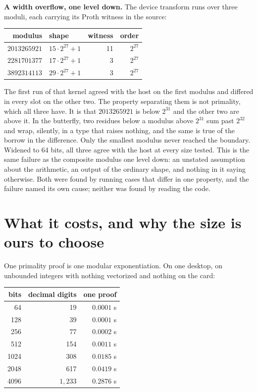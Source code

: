 \documentclass{article}
\begin{document}
\textbf{A width overflow, one level down.} The device transform runs over three moduli, each carrying its Proth witness in the source:

\begin{center}
\begin{tabular}{@{}rlrr@{}}
\toprule
modulus & shape & witness & order \\
\midrule
\(2013265921\) & \(15 \cdot 2^{27} + 1\) & 11 & \(2^{27}\) \\
\(2281701377\) & \(17 \cdot 2^{27} + 1\) & 3 & \(2^{27}\) \\
\(3892314113\) & \(29 \cdot 2^{27} + 1\) & 3 & \(2^{27}\) \\
\bottomrule
\end{tabular}
\end{center}

The first run of that kernel agreed with the host on the first modulus and differed in every slot on the other two. The property separating them is not primality, which all three have. It is that \(2013265921\) is below \(2^{31}\) and the other two are above it. In the butterfly, two residues below a modulus above \(2^{31}\) sum past \(2^{32}\) and wrap, silently, in a type that raises nothing, and the same is true of the borrow in the difference. Only the smallest modulus never reached the boundary. Widened to 64 bits, all three agree with the host at every size tested. This is the same failure as the composite modulus one level down: an unstated assumption about the arithmetic, an output of the ordinary shape, and nothing in it saying otherwise. Both were found by running cases that differ in one property, and the failure named its own cause; neither was found by reading the code.

\section{What it costs, and why the size is ours to choose}

One primality proof is one modular exponentiation. On one desktop, on unbounded integers with nothing vectorized and nothing on the card:

\begin{center}
\begin{tabular}{@{}rrr@{}}
\toprule
bits & decimal digits & one proof \\
\midrule
64 & 19 & \(0.0001\) s \\
128 & 39 & \(0.0001\) s \\
256 & 77 & \(0.0002\) s \\
512 & 154 & \(0.0011\) s \\
1024 & 308 & \(0.0185\) s \\
2048 & 617 & \(0.0419\) s \\
4096 & \(1{,}233\) & \(0.2876\) s \\
\bottomrule
\end{tabular}
\end{center}
\end{document}
